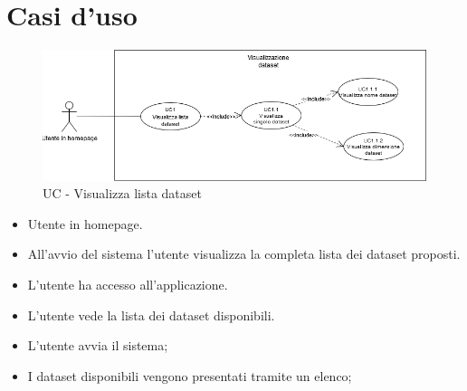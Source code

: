 \section{Casi d'uso}

    \begin{figure}[h!]
        \centering
        \includegraphics[scale=0.55]{template/images/UC1.png}
        \caption{UC - Visualizza lista dataset}
    \end{figure}
    \UCdsc
    { %
        \begin{itemize}
            \item Utente in homepage.
        \end{itemize}
    }
    { %
        \begin{itemize}
            \item All'avvio del sistema l'utente visualizza la completa lista dei dataset proposti.
        \end{itemize}
    }
    { %
        \begin{itemize}
            \item L'utente ha accesso all'applicazione.
        \end{itemize}
    }
    { %
        \begin{itemize}
            \item L'utente vede la lista dei dataset disponibili.
        \end{itemize}
    }
    { %
        \begin{itemize}
            \item L'utente avvia il sistema;
            \item I dataset disponibili vengono presentati tramite un elenco;
        \end{itemize}
    }


